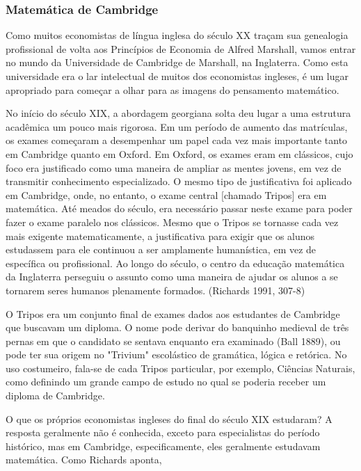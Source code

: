 \documentclass[a4paper,12pt]{article}[abntex2]
\begin{document}
\subsubsection{\textbf{Matemática de Cambridge}}

Como muitos economistas de língua inglesa do século XX traçam sua genealogia profissional de volta aos Princípios de Economia de Alfred Marshall, vamos entrar no mundo da Universidade de Cambridge de Marshall, na Inglaterra. Como esta universidade era o lar intelectual de muitos dos economistas ingleses, é um lugar apropriado para começar a olhar para as imagens do pensamento matemático.

No início do século XIX, a abordagem georgiana solta deu lugar a uma estrutura acadêmica um pouco mais rigorosa. Em um período de aumento das matrículas, os exames começaram a desempenhar um papel cada vez mais importante tanto em Cambridge quanto em Oxford. Em Oxford, os exames eram em clássicos, cujo foco era justificado como uma maneira de ampliar as mentes jovens, em vez de transmitir conhecimento especializado. O mesmo tipo de justificativa foi aplicado em Cambridge, onde, no entanto, o exame central [chamado Tripos] era em matemática. Até meados do século, era necessário passar neste exame para poder fazer o exame paralelo nos clássicos. Mesmo que o Tripos se tornasse cada vez mais exigente matematicamente, a justificativa para exigir que os alunos estudassem para ele continuou a ser amplamente humanística, em vez de específica ou profissional. Ao longo do século, o centro da educação matemática da Inglaterra perseguiu o assunto como uma maneira de ajudar os alunos a se tornarem seres humanos plenamente formados. (Richards 1991, 307-8)

O Tripos era um conjunto final de exames dados aos estudantes de Cambridge que buscavam um diploma. O nome pode derivar do banquinho medieval de três pernas em que o candidato se sentava enquanto era examinado (Ball 1889), ou pode ter sua origem no "Trivium" escolástico de gramática, lógica e retórica. No uso costumeiro, fala-se de cada Tripos particular, por exemplo, Ciências Naturais, como definindo um grande campo de estudo no qual se poderia receber um diploma de Cambridge.

O que os próprios economistas ingleses do final do século XIX estudaram? A resposta geralmente não é conhecida, exceto para especialistas do período histórico, mas em Cambridge, especificamente, eles geralmente estudavam matemática. Como Richards aponta,
\end{document}
